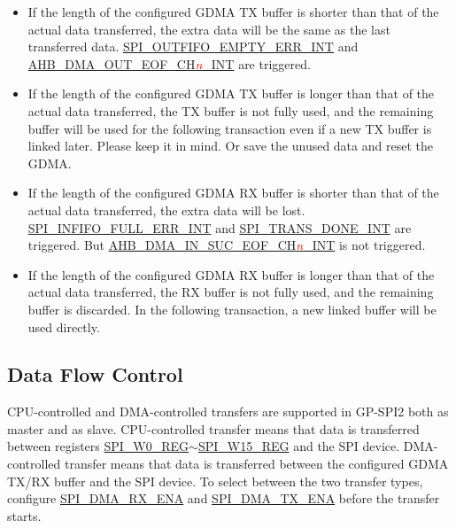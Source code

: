 \documentclass[main\_\_EN.tex]{subfiles}
\begin{document}
\begin{itemize}
    \item If the length of the configured GDMA TX buffer is shorter than that of the actual data transferred, the extra data will be the same as the last transferred data. \hyperref[int:SPIOUTFIFOEMPTYERRINT]{SPI\_OUTFIFO\_EMPTY\_ERR\_INT} and \hyperref[int:GDMAOUTEOFINT]{AHB\_DMA\_OUT\_EOF\_CH\textcolor{red}{\it{n}}\_INT} are triggered.
    
    \item If the length of the configured GDMA TX buffer is longer than that of the actual data transferred, the TX buffer is not fully used, and the remaining buffer will be used for the following transaction even if a new TX buffer is linked later. Please keep it in mind. Or save the unused data and reset the GDMA.
    
    \item If the length of the configured GDMA RX buffer is shorter than that of the actual data transferred, the extra data will be lost. \hyperref[int:SPIINFIFOFULLERRINT]{SPI\_INFIFO\_FULL\_ERR\_INT} and \hyperref[int:SPITRANSDONEINT]{SPI\_TRANS\_DONE\_INT} are triggered. But \hyperref[int:GDMAINSUCEOFINT]{AHB\_DMA\_IN\_SUC\_EOF\_CH\textcolor{red}{\it{n}}\_INT} is not triggered.
    
    \item If the length of the configured GDMA RX buffer is longer than that of the actual data transferred, the RX buffer is not fully used, and the remaining buffer is discarded. In the following transaction, a new linked buffer will be used directly.
    
\end{itemize}

\subsection{Data Flow Control}\label{sec:data-flow-control-in-gp-spi-master-and-slave-mode}

CPU-controlled and DMA-controlled transfers are supported in GP-SPI2 both as master and as slave.
CPU-controlled transfer means that data is transferred between registers \hyperref[regdesc:SPIW0REG]{SPI\_W0\_REG}$\sim$\hyperref[regdesc:SPIW15REG]{SPI\_W15\_REG} and the SPI device. DMA-controlled transfer means that data is transferred between the configured GDMA TX/RX buffer and the SPI device. To select between the two transfer types, configure \hyperref[fielddesc:SPIDMARXENA]{SPI\_DMA\_RX\_ENA} and \hyperref[fielddesc:SPIDMATXENA]{SPI\_DMA\_TX\_ENA} before the transfer starts.
\end{document}
